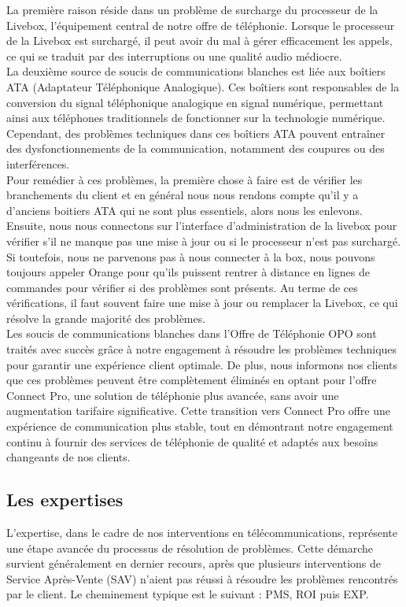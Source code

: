 \documentclass[12pt, a4paper]{article}
\begin{document}
La première raison réside dans un problème de surcharge du
processeur de la Livebox, l'équipement central de notre offre
de téléphonie. Lorsque le processeur de la Livebox est surchargé,
il peut avoir du mal à gérer efficacement les appels, ce qui se
traduit par des interruptions ou une qualité audio médiocre.\\

La deuxième source de soucis de communications blanches est
liée aux boîtiers ATA (Adaptateur Téléphonique Analogique).
Ces boîtiers sont responsables de la conversion du signal
téléphonique analogique en signal numérique, permettant ainsi
aux téléphones traditionnels de fonctionner sur la technologie
numérique. Cependant, des problèmes techniques dans ces boîtiers
ATA pouvent entraîner des dysfonctionnements de la communication,
notamment des coupures ou des interférences.\\

Pour remédier à ces problèmes, la première chose à faire est 
de vérifier les branchements du client et 
en général nous nous rendons compte qu'il y a d'anciens 
boitiers ATA qui ne sont plus essentiels, alors nous 
les enlevons. Ensuite, nous
nous connectons sur l'interface d'administration de la livebox 
pour vérifier s'il ne manque pas une mise à jour ou si le 
processeur n'est pas surchargé. Si toutefois, nous 
ne parvenons pas à nous connecter à la box, nous pouvons 
toujours appeler Orange pour qu'ils puissent rentrer 
à distance en lignes de commandes pour 
vérifier si des problèmes sont présents.
Au terme de ces vérifications, il faut souvent 
faire une mise à jour ou remplacer la Livebox, 
ce qui résolve la grande majorité des problèmes.\\

Les soucis de communications blanches dans l'Offre de Téléphonie
\gls{OPO} sont traités avec succès grâce à notre engagement à résoudre
les problèmes techniques pour garantir une expérience client
optimale. De plus, nous informons nos clients que ces problèmes peuvent
être complètement éliminés en optant pour l'offre Connect Pro,
une solution de téléphonie plus avancée, sans avoir une
augmentation tarifaire significative. Cette transition vers
Connect Pro offre une expérience de communication plus stable,
tout en démontrant notre engagement continu à fournir des
services de téléphonie de qualité et adaptés aux besoins
changeants de nos clients.

\newpage
\subsection{Les expertises}
L'expertise, dans le cadre de nos interventions en télécommunications,
représente une étape avancée du processus de résolution de problèmes.
Cette démarche survient généralement en dernier recours, après que
plusieurs interventions de Service Après-Vente (SAV) n'aient pas
réussi à résoudre les problèmes rencontrés par le client. Le cheminement
typique est le suivant : \gls{PMS}, \gls{ROI} puis \gls{EXP}.\\
\end{document}
